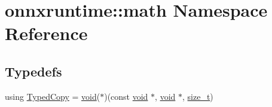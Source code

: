 \hypertarget{namespaceonnxruntime_1_1math}{}\section{onnxruntime\+:\+:math Namespace Reference}
\label{namespaceonnxruntime_1_1math}
\subsection*{Typedefs}
\begin{DoxyCompactItemize}
\item 
using \mbox{\hyperlink{namespaceonnxruntime_1_1math_a4fd61c06d9e9e1bc3ceb526787eab4e7}{Typed\+Copy}} = \mbox{\hyperlink{mlasi_8h_a88f941d423cb2a819b70a1358982b1a6}{void}}($\ast$)(const \mbox{\hyperlink{mlasi_8h_a88f941d423cb2a819b70a1358982b1a6}{void}} $\ast$, \mbox{\hyperlink{mlasi_8h_a88f941d423cb2a819b70a1358982b1a6}{void}} $\ast$, \mbox{\hyperlink{mlasi_8h_a503efbc1c6e50825320ad909366b78ab}{size\+\_\+t}})
\end{DoxyCompactItemize}
